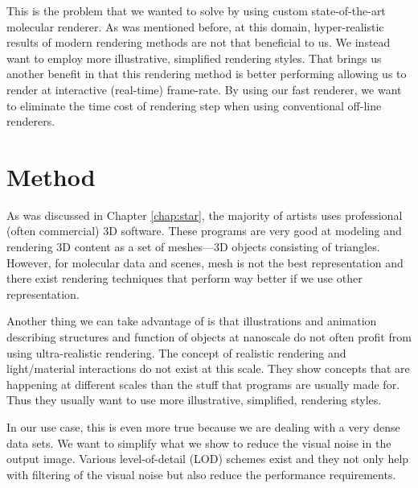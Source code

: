 \documentclass[
  digital, %
  table,   %
  nolof,     %
  nolot,     %
]{fithesis3}
\begin{document}
This is the problem that we wanted to solve by using custom state-of-the-art molecular renderer. As was mentioned before, at this domain, hyper-realistic results of modern rendering methods are not that beneficial to us. We instead want to employ more illustrative, simplified rendering styles. That brings us another benefit in that this rendering method is better performing allowing us to render at interactive (real-time) frame-rate. By using our fast renderer, we want to eliminate the time cost of rendering step when using conventional off-line renderers.

\chapter{Method}
\label{chap:method}

As was discussed in Chapter \ref{chap:star}, the majority of artists uses professional (often commercial) 3D software. These programs are very good at modeling and rendering 3D content as a set of meshes—3D objects consisting of triangles. However, for molecular data and scenes, mesh is not the best representation and there exist rendering techniques that perform way better if we use other representation.

Another thing we can take advantage of is that illustrations and animation describing structures and function of objects at nanoscale do not often profit from using ultra-realistic rendering. The concept of realistic rendering and light/material interactions do not exist at this scale. They show concepts that are happening at different scales than the stuff that programs are usually made for. Thus they usually want to use more illustrative, simplified, rendering styles.

In our use case, this is even more true because we are dealing with a very dense data sets. We want to simplify what we show to reduce the visual noise in the output image. Various level-of-detail (LOD) schemes exist and they not only help with filtering of the visual noise but also reduce the performance requirements.
\end{document}
